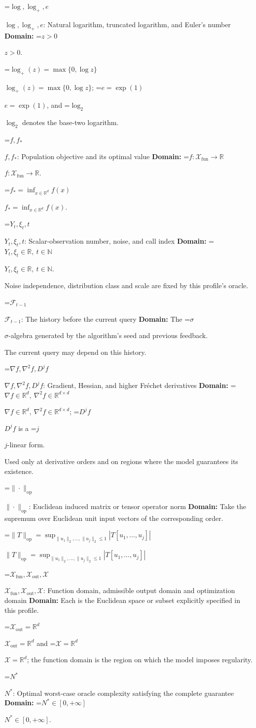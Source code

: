 \documentclass[10pt,a4paper]{article}
\newcommand{\AtlasMath}[1]{\par\begingroup\centering\setbox0=\hbox{$\displaystyle #1$}\ifdim\wd0>1.4\linewidth\typeout{ATLAS WIDE FORMULA: \the\wd0}\fi\ifdim\wd0>\linewidth\resizebox{\linewidth}{!}{\box0}\else\box0\fi\par\endgroup}
\newcommand{\AtlasInlineMath}[1]{\begingroup\setbox0=\hbox{$#1$}\ifdim\wd0>.4\linewidth\endgroup\AtlasMath{#1}\else\endgroup$#1$\fi}
\begin{document}
\AtlasInlineMath{\log,\log_+,e}: Natural logarithm, truncated logarithm, and Euler's number \textbf{Domain:} \AtlasInlineMath{z>0}.

\AtlasInlineMath{\log_+(z)=\max\{0,\log z\}}; \AtlasInlineMath{e=\exp(1)}, and \AtlasInlineMath{\log_2} denotes the base-two logarithm.

\AtlasInlineMath{f,f_*}: Population objective and its optimal value \textbf{Domain:} \AtlasInlineMath{f:\mathcal{X}_{\mathrm{fun}}\to\mathbb{R}}.

\AtlasInlineMath{f_*=\inf_{x\in \mathbb{R}^d}f(x)}.

\AtlasInlineMath{Y_t,\xi_t,t}: Scalar-observation number, noise, and call index \textbf{Domain:} \AtlasInlineMath{Y_t,\xi_t\in\mathbb{R},\ t\in\mathbb{N}}.

Noise independence, distribution class and scale are fixed by this profile's oracle.

\AtlasInlineMath{\mathcal{F}_{t-1}}: The history before the current query \textbf{Domain:} The \AtlasInlineMath{\sigma}-algebra generated by the algorithm's seed and previous feedback.

The current query may depend on this history.

\AtlasInlineMath{\nabla f,\nabla^2f,D^jf}: Gradient, Hessian, and higher Fréchet derivatives \textbf{Domain:} \AtlasInlineMath{\nabla f\in\mathbb{R}^d,\ \nabla^2f\in\mathbb{R}^{d\times d}}; \AtlasInlineMath{D^jf} is a \AtlasInlineMath{j}-linear form.

Used only at derivative orders and on regions where the model guarantees its existence.

\AtlasInlineMath{\|\cdot\|_{\mathrm{op}}}: Euclidean induced matrix or tensor operator norm \textbf{Domain:} Take the supremum over Euclidean unit input vectors of the corresponding order.

\AtlasInlineMath{\|T\|_{\mathrm{op}}=\sup_{\|u_1\|_2,\ldots,\|u_j\|_2\le1}|T[u_1,\ldots,u_j]|}

\AtlasInlineMath{\mathcal{X}_{\mathrm{fun}},\mathcal{X}_{\mathrm{out}},\mathcal{X}}: Function domain, admissible output domain and optimization domain \textbf{Domain:} Each is the Euclidean space or subset explicitly specified in this profile.

\AtlasInlineMath{\mathcal{X}_{\mathrm{out}}=\mathbb{R}^d} and \AtlasInlineMath{\mathcal{X}=\mathbb{R}^d}; the function domain is the region on which the model imposes regularity.

\AtlasInlineMath{N^*}: Optimal worst-case oracle complexity satisfying the complete guarantee \textbf{Domain:} \AtlasInlineMath{N^*\in[0,+\infty]}.
\end{document}

